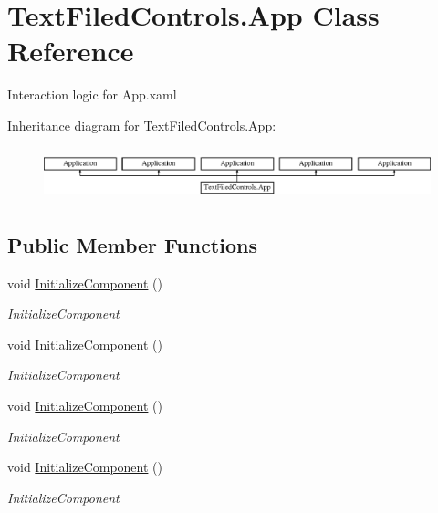 \hypertarget{class_text_filed_controls_1_1_app}{}\section{Text\+Filed\+Controls.\+App Class Reference}
\label{class_text_filed_controls_1_1_app}


Interaction logic for App.\+xaml  


Inheritance diagram for Text\+Filed\+Controls.\+App\+:\begin{figure}[H]
\begin{center}
\leavevmode
\includegraphics[height=1.544828cm]{d7/dd1/class_text_filed_controls_1_1_app}
\end{center}
\end{figure}
\subsection*{Public Member Functions}
\begin{DoxyCompactItemize}
\item 
void \mbox{\hyperlink{class_text_filed_controls_1_1_app_a77dc852f132a2b9450aa443e2cb254af}{Initialize\+Component}} ()
\begin{DoxyCompactList}\small\item\em Initialize\+Component \end{DoxyCompactList}\item 
void \mbox{\hyperlink{class_text_filed_controls_1_1_app_a77dc852f132a2b9450aa443e2cb254af}{Initialize\+Component}} ()
\begin{DoxyCompactList}\small\item\em Initialize\+Component \end{DoxyCompactList}\item 
void \mbox{\hyperlink{class_text_filed_controls_1_1_app_a77dc852f132a2b9450aa443e2cb254af}{Initialize\+Component}} ()
\begin{DoxyCompactList}\small\item\em Initialize\+Component \end{DoxyCompactList}\item 
void \mbox{\hyperlink{class_text_filed_controls_1_1_app_a77dc852f132a2b9450aa443e2cb254af}{Initialize\+Component}} ()
\begin{DoxyCompactList}\small\item\em Initialize\+Component \end{DoxyCompactList}\end{DoxyCompactItemize}
